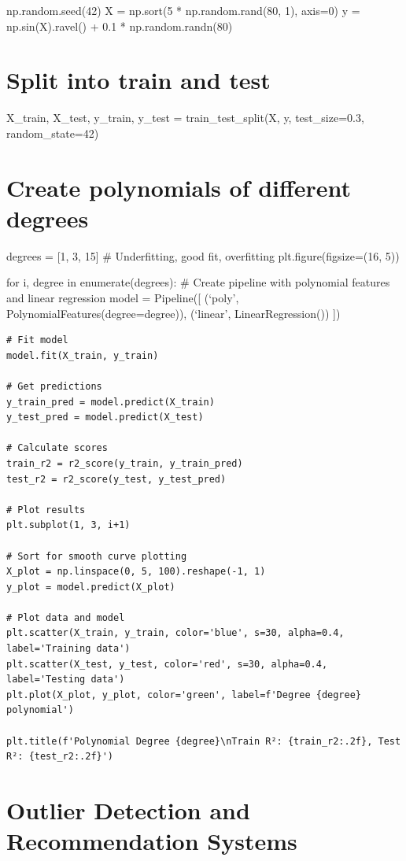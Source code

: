 \documentclass[
  letterpaper,
  DIV=11,
  numbers=noendperiod]{scrreprt}
\begin{document}
np.random.seed(42) X = np.sort(5 * np.random.rand(80, 1), axis=0) y =
np.sin(X).ravel() + 0.1 * np.random.randn(80)


\chapter{Split into train and test}\label{split-into-train-and-test}

X\_train, X\_test, y\_train, y\_test = train\_test\_split(X, y,
test\_size=0.3, random\_state=42)


\chapter{Create polynomials of different
degrees}\label{create-polynomials-of-different-degrees}

degrees = {[}1, 3, 15{]} \# Underfitting, good fit, overfitting
plt.figure(figsize=(16, 5))

for i, degree in enumerate(degrees): \# Create pipeline with polynomial
features and linear regression model = Pipeline({[} (`poly',
PolynomialFeatures(degree=degree)), (`linear', LinearRegression()) {]})

\begin{verbatim}
# Fit model
model.fit(X_train, y_train)

# Get predictions
y_train_pred = model.predict(X_train)
y_test_pred = model.predict(X_test)

# Calculate scores
train_r2 = r2_score(y_train, y_train_pred)
test_r2 = r2_score(y_test, y_test_pred)

# Plot results
plt.subplot(1, 3, i+1)

# Sort for smooth curve plotting
X_plot = np.linspace(0, 5, 100).reshape(-1, 1)
y_plot = model.predict(X_plot)

# Plot data and model
plt.scatter(X_train, y_train, color='blue', s=30, alpha=0.4, label='Training data')
plt.scatter(X_test, y_test, color='red', s=30, alpha=0.4, label='Testing data')
plt.plot(X_plot, y_plot, color='green', label=f'Degree {degree} polynomial')

plt.title(f'Polynomial Degree {degree}\nTrain R²: {train_r2:.2f}, Test R²: {test_r2:.2f}')
\end{verbatim}


\chapter{Outlier Detection and Recommendation
Systems}\label{outlier-detection-and-recommendation-systems}
\end{document}
